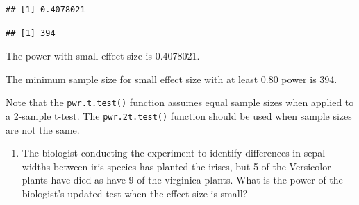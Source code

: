 \documentclass[
]{book}
\newenvironment{Shaded}{\begin{snugshade}}{\end{snugshade}}
\newcommand{\AttributeTok}[1]{\textcolor[rgb]{0.13,0.29,0.53}{#1}}
\newcommand{\DecValTok}[1]{\textcolor[rgb]{0.00,0.00,0.81}{#1}}
\newcommand{\DocumentationTok}[1]{\textcolor[rgb]{0.56,0.35,0.01}{\textbf{\textit{#1}}}}
\newcommand{\FloatTok}[1]{\textcolor[rgb]{0.00,0.00,0.81}{#1}}
\newcommand{\FunctionTok}[1]{\textcolor[rgb]{0.13,0.29,0.53}{\textbf{#1}}}
\newcommand{\NormalTok}[1]{#1}
\newcommand{\OtherTok}[1]{\textcolor[rgb]{0.56,0.35,0.01}{#1}}
\newcommand{\SpecialCharTok}[1]{\textcolor[rgb]{0.81,0.36,0.00}{\textbf{#1}}}
\newcommand{\StringTok}[1]{\textcolor[rgb]{0.31,0.60,0.02}{#1}}
\providecommand{\tightlist}{%
  \setlength{\itemsep}{0pt}\setlength{\parskip}{0pt}}
\theoremstyle{definition}
\theoremstyle{definition}
\theoremstyle{definition}
\theoremstyle{definition}
\theoremstyle{remark}
\begin{document}
\begin{Shaded}
\end{Shaded}

\begin{verbatim}
## [1] 0.4078021
\end{verbatim}

\begin{Shaded}
\end{Shaded}

\begin{verbatim}
## [1] 394
\end{verbatim}

The power with small effect size is 0.4078021.

The minimum sample size for small effect size with at least 0.80 power is 394.

Note that the \texttt{pwr.t.test()} function assumes equal sample sizes when applied to a 2-sample t-test. The \texttt{pwr.2t.test()} function should be used when sample sizes are not the same.

\begin{enumerate}
\def\labelenumi{\arabic{enumi}.}
\setcounter{enumi}{3}
\tightlist
\item
  The biologist conducting the experiment to identify differences in sepal widths between iris species has planted the irises, but 5 of the Versicolor plants have died as have 9 of the virginica plants. What is the power of the biologist's updated test when the effect size is small?
\end{enumerate}
\end{document}
